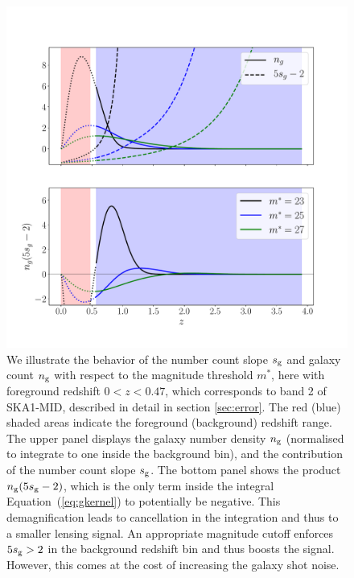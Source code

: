 \documentclass[useAMS,usenatbib]{mnras}
\begin{document}
\begin{figure}
\centering\includegraphics[width=0.95\columnwidth]{W_and_sg_SKAB2.pdf}
\caption{We illustrate the behavior of the number count slope $s_{\rm g}$ and galaxy count $n_{\rm g}$ with respect to the magnitude threshold $m^*$, here with foreground redshift $0<z<0.47$, which corresponds to band 2 of SKA1-MID, described in detail in section \ref{sec:error}. The red (blue) shaded areas indicate the foreground (background) redshift range. The upper panel displays the galaxy number density $n_{\rm g}$ (normalised to integrate to one inside the background bin), and the contribution of the number count slope $s_{\rm g}$. The bottom panel shows the product $n_{\rm g}(5s_{\rm g} -2)$, which is the only term inside the integral Equation~(\ref{eq:gkernel}) to potentially be negative. This demagnification leads to cancellation in the integration and thus to a smaller lensing signal. An appropriate magnitude cutoff enforces $5s_{\rm g} >2$ in the background redshift bin and thus boosts the signal. However, this comes at the cost of increasing the galaxy shot noise.}
\label{fig:gkernel}
\end{figure}
\end{document}

